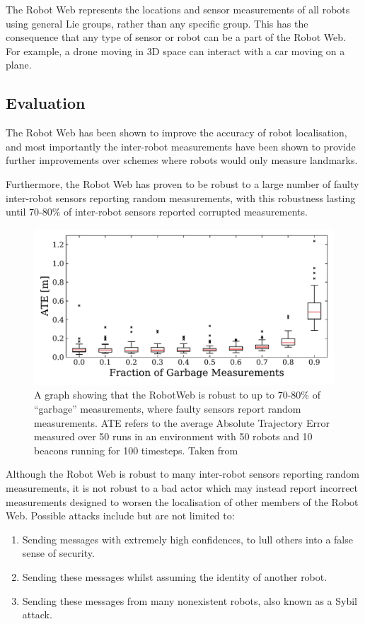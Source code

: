 The Robot Web represents the locations and sensor measurements of all robots using general Lie groups, rather than any specific group. This has the consequence that any type of sensor or robot can be a part of the Robot Web. For example, a drone moving in 3D space can interact with a car moving on a plane.

\subsection{Evaluation}
The Robot Web has been shown to improve the accuracy of robot localisation, and most importantly the inter-robot measurements have been shown to provide further improvements over schemes where robots would only measure landmarks. %

Furthermore, the Robot Web has proven to be robust to a large number of faulty inter-robot sensors reporting random measurements, with this robustness lasting until 70-80\% of inter-robot sensors reported corrupted measurements.

\begin{figure}[!h]
    \centering
    \includegraphics[page=1,width=.60\textwidth]{diagrams/sensor_noise.pdf}
    \caption[RobotWeb's robustness to garbage measurements]{A graph showing that the RobotWeb is robust to up to 70-80\% of ``garbage'' measurements, where faulty sensors report random measurements. ATE refers to the average Absolute Trajectory Error measured over 50 runs in an environment with 50 robots and 10 beacons running for 100 timesteps. Taken from \cite[Figure~5]{Robotweb}}
\end{figure}

Although the Robot Web is robust to many inter-robot sensors reporting random measurements, it is not robust to a bad actor which may instead report incorrect measurements designed to worsen the localisation of other members of the Robot Web. Possible attacks include but are not limited to:

\begin{enumerate}
    \item Sending messages with extremely high confidences, to lull others into a false sense of security.
    \item Sending these messages whilst assuming the identity of another robot.
    \item Sending these messages from many nonexistent robots, also known as a Sybil attack.
\end{enumerate}

